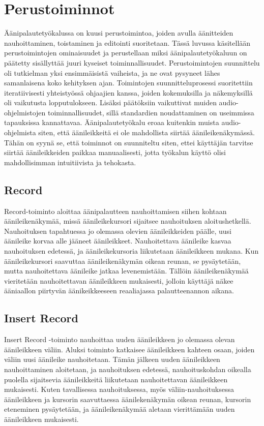 \documentclass[utf8]{gradu3}
\begin{document}
\section{Perustoiminnot}

Äänipalautetyökalussa on kuusi perustoimintoa, joiden avulla äänitteiden nauhoittaminen, toistaminen ja editointi suoritetaan. Tässä luvussa käsitellään perustoimintojen ominaisuudet ja perustellaan miksi äänipalautetyökaluun on päätetty sisällyttää juuri kyseiset toiminnallisuudet. Perustoimintojen suunnittelu oli tutkielman yksi ensimmäisistä vaiheista, ja ne ovat pysyneet lähes samanlaisena koko kehityksen ajan. Toimintojen suunnitteluprosessi suoritettiin iteratiivisesti yhteistyössä ohjaajien kanssa, joiden kokemuksilla ja näkemyksillä oli vaikutusta lopputulokseen. Lisäksi päätöksiin vaikuttivat muiden audio-ohjelmistojen toiminnallisuudet, sillä standardien noudattaminen on useimmissa tapauksissa kannattavaa. Äänipalautetyökalu eroaa kuitenkin muista audio-ohjelmista siten, että äänileikkeitä ei ole mahdollista siirtää äänileikenäkymässä. Tähän on syynä se, että toiminnot on suunniteltu siten, ettei käyttäjän tarvitse siirtää äänileikkeiden paikkaa manuaalisesti, jotta työkalun käyttö olisi mahdollisimman intuitiivista ja tehokasta.

\subsection{Record}

Record-toiminto aloittaa äänipalautteen nauhoittamisen siihen kohtaan äänileikenäkymää, missä äänileikekursori sijaitsee nauhoituksen aloitushetkellä. Nauhoituksen tapahtuessa jo olemassa olevien äänileikkeiden päälle, uusi äänileike korvaa alle jääneet äänileikkeet. Nauhoitettava äänileike kasvaa nauhoituksen edetessä, ja äänileikekursoria liikutetaan äänileikkeen mukana. Kun äänileikekursori saavuttaa äänileikenäkymän oikean reunan, se pysäytetään, mutta nauhoitettava äänileike jatkaa levenemistään. Tällöin äänileikenäkymää vieritetään nauhoitettavan äänileikkeen mukaisesti, jolloin käyttäjä näkee ääniaallon piirtyvän äänikeikkeeseen reaaliajassa palautteenannon aikana. 

\subsection{Insert Record}

Insert Record -toiminto nauhoittaa uuden äänileikkeen jo olemassa olevan äänileikkeen väliin. Aluksi toiminto katkaisee äänileikkeen kahteen osaan, joiden väliin uusi äänileike nauhoitetaan. Tämän jälkeen uuden äänileikkeen nauhoittaminen aloitetaan, ja nauhoituksen edetessä, nauhoituskohdan oikealla puolella sijaitsevia äänileikkeitä liikutetaan nauhoitettavan äänileikkeen mukaisesti. Kuten tavallisessa nauhoituksessa, myös väliin-nauhoituksessa äänileikkeen ja kursorin saavuttaessa äänilekenäkymän oikean reunan, kursorin eteneminen pysäytetään, ja äänileikenäkymää aletaan vierittämään uuden äänileikkeen mukaisesti.
\end{document}
